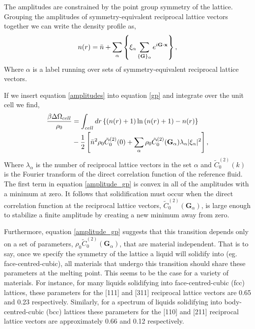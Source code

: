 The amplitudes are constrained by the point group symmetry of the lattice.
Grouping the amplitudes of symmetry-equivalent reciprocal lattice vectors
together we can write the density profile as,
%
\begin{equation}
    \label{amplitudes}
    n(r) = \bar{n}
         + \sum_\alpha \left\lbrace
            \xi_\alpha \sum_{\lbrace\mathbf{G}\rbrace_\alpha}
                e^{i\mathbf{G} \cdot \mathbf{x}}\right\rbrace,
\end{equation}
%
Where $\alpha$ is a label running over sets of symmetry-equivalent reciprocal
lattice vectors.

If we insert equation \ref{amplitudes} into equation \ref{gp} and integrate
over the unit cell we find,
%
\begin{align}
    \label{amplitude_gp} 
    \frac{\beta \Delta\Omega_{cell}}{\rho_0} &=  \int_{cell} 
        dr \left\lbrace (n(r) + 1)\ln\left(n(r) + 1\right) - n(r) \right\rbrace \nonumber \\
    &- \frac{1}{2} \left[\bar{n} ^ 2 \rho_0\tilde{C}^{(2)}_0(0) + \sum_\alpha\rho_0\tilde{C}^{(2)}_0
            (\mathbf{G}_\alpha) \lambda_\alpha\vert\xi_\alpha\vert^2\right],
\end{align}
%
Where $\lambda_\alpha$ is the number of reciprocal lattice vectors in the set
$\alpha$ and $\tilde{C}^{(2)}_0(k)$ is the Fourier transform of the direct
correlation function of the reference fluid. The first term in equation
\ref{amplitude_gp} is convex in all of the amplitudes with a minimum at zero.
It follows that solidification must occur when the direct correlation function
at the reciprocal lattice vectors, $\tilde{C}^{(2)}_0(\mathbf{G}_\alpha)$, is
large enough to stabilize a finite amplitude by creating a new minimum away
from zero.

Furthermore, equation \ref{amplitude_gp} suggests that this transition depends
only on a set of parameters, $\rho_0 \tilde{C}^{(2)}_0(\mathbf{G}_\alpha)$,
that are material independent.  That is to say, once we specify the symmetry of
the lattice a liquid will solidify into (eg.  face-centred-cubic), all
materials that undergo this transition should share these parameters at the
melting point. This seems to be the case for a variety of materials. For
instance, for many liquids solidifying into face-centred-cubic (fcc) lattices,
these parameters for the [111] and [311] reciprocal lattice vectors are 0.65
and 0.23 respectively. Similarly, for a spectrum of liquids solidifying into
body-centred-cubic (bcc) lattices these parameters  for the [110] and [211]
reciprocal lattice vectors are approximately 0.66 and 0.12 respectively.

